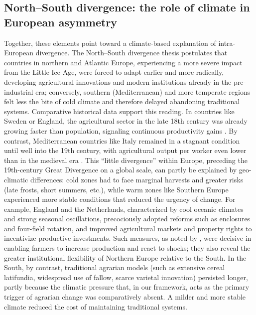 \documentclass[11pt,a4paper]{article}
\begin{document}
\subsection*{North--South divergence: the role of climate in European asymmetry}
Together, these elements point toward a climate-based explanation of intra-European divergence. The North--South divergence thesis postulates that countries in northern and Atlantic Europe, experiencing a more severe impact from the Little Ice Age, were forced to adapt earlier and more radically, developing agricultural innovations and modern institutions already in the pre-industrial era; conversely, southern (Mediterranean) and more temperate regions felt less the bite of cold climate and therefore delayed abandoning traditional systems.
Comparative historical data support this reading. In countries like Sweden or England, the agricultural sector in the late 18th century was already growing faster than population, signaling continuous productivity gains \parencite{OlssonSvensson2010}. By contrast, Mediterranean countries like Italy remained in a stagnant condition until well into the 19th century, with agricultural output per worker even lower than in the medieval era \parencite{FedericoMalanima2004}. This ``little divergence'' within Europe, preceding the 19th-century Great Divergence on a global scale, can partly be explained by geo-climatic differences: cold zones had to face marginal harvests and greater risks (late frosts, short summers, etc.), while warm zones like Southern Europe experienced more stable conditions that reduced the urgency of change.
For example, England and the Netherlands, characterized by cool oceanic climates and strong seasonal oscillations, precociously adopted reforms such as enclosures and four-field rotation, and improved agricultural markets and property rights to incentivize productive investments. Such measures, as noted by \textcite{OlssonSvensson2010}, were decisive in enabling farmers to increase production and react to shocks; they also reveal the greater institutional flexibility of Northern Europe relative to the South. In the South, by contrast, traditional agrarian models (such as extensive cereal latifundia, widespread use of fallow, scarce varietal innovation) persisted longer, partly because the climatic pressure that, in our framework, acts as the primary trigger of agrarian change was comparatively absent. A milder and more stable climate reduced the cost of maintaining traditional systems.
\end{document}
